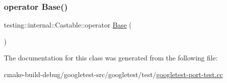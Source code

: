 \subsubsection{\texorpdfstring{operator Base()}{operator Base()}}
{\footnotesize\ttfamily testing\+::internal\+::\+Castable\+::operator \mbox{\hyperlink{classBase}{Base}} (\begin{DoxyParamCaption}{ }\end{DoxyParamCaption})\hspace{0.3cm}{\ttfamily [inline]}}



The documentation for this class was generated from the following file\+:\begin{DoxyCompactItemize}
\item 
cmake-\/build-\/debug/googletest-\/src/googletest/test/\mbox{\hyperlink{googletest-port-test_8cc}{googletest-\/port-\/test.\+cc}}\end{DoxyCompactItemize}
